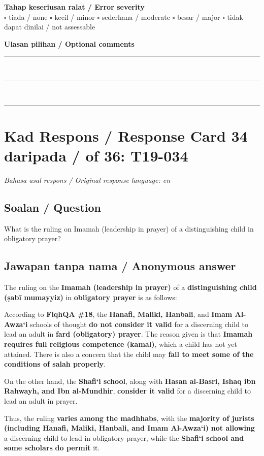 \documentclass[11pt,a4paper]{article}
\begin{document}
\medskip
\textbf{Tahap keseriusan ralat / Error severity}\\
$\square$ tiada / none \quad $\square$ kecil / minor \quad $\square$ sederhana / moderate \quad
$\square$ besar / major \quad $\square$ tidak dapat dinilai / not assessable

\medskip
\textbf{Ulasan pilihan / Optional comments}\\[3pt]
\rule{\textwidth}{0.4pt}\\[16pt]
\rule{\textwidth}{0.4pt}\\[16pt]
\rule{\textwidth}{0.4pt}

\newpage
\section*{Kad Respons / Response Card 34 daripada / of 36: T19-034}
\textit{Bahasa asal respons / Original response language: en}

\subsection*{Soalan / Question}
What is the ruling on Imamah (leadership in prayer) of a distinguishing child in obligatory prayer?

\subsection*{Jawapan tanpa nama / Anonymous answer}
The ruling on the \textbf{Imamah (leadership in prayer)} of a \textbf{distinguishing child (ṣabī mumayyiz)} in \textbf{obligatory prayer} is as follows:\par\medskip According to \textbf{FiqhQA \#18}, the \textbf{Hanafi, Maliki, Hanbali}, and \textbf{Imam Al-Awza‘i} schools of thought \textbf{do not consider it valid} for a discerning child to lead an adult in \textbf{fard (obligatory) prayer}. The reason given is that \textbf{Imamah requires full religious competence (kamāl)}, which a child has not yet attained. There is also a concern that the child may \textbf{fail to meet some of the conditions of salah properly}.\par\medskip On the other hand, the \textbf{Shafi‘i school}, along with \textbf{Hasan al-Basri, Ishaq ibn Rahwayh, and Ibn al-Mundhir}, \textbf{consider it valid} for a discerning child to lead an adult in prayer.\par\medskip Thus, the ruling \textbf{varies among the madhhabs}, with the \textbf{majority of jurists (including Hanafi, Maliki, Hanbali, and Imam Al-Awza‘i)} \textbf{not allowing} a discerning child to lead in obligatory prayer, while the \textbf{Shafi‘i school and some scholars} \textbf{do permit} it.
\end{document}
